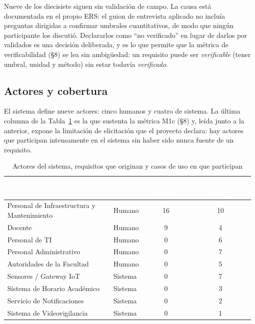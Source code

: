 Nueve de los diecisiete siguen sin validaci\'on de campo. La causa est\'a documentada en el propio ERS: el guion de entrevista aplicado no inclu\'ia preguntas dirigidas a confirmar umbrales cuantitativos, de modo que ning\'un participante los discuti\'o. Declararlos como ``no verificado'' en lugar de darlos por validados es una decisi\'on deliberada, y es lo que permite que la m\'etrica de verificabilidad (\S8) se lea sin ambig\"uedad: un requisito puede ser \emph{verificable} (tener umbral, unidad y m\'etodo) sin estar todav\'ia \emph{verificado}.

\subsection{Actores y cobertura}

El sistema define nueve actores: cinco humanos y cuatro de sistema. La \'ultima columna de la Tabla~\ref{tab:actores} es la que sustenta la m\'etrica M1c (\S8) y, le\'ida junto a la anterior, expone la limitaci\'on de elicitaci\'on que el proyecto declara: hay actores que participan intensamente en el sistema sin haber sido nunca fuente de un requisito.

\begin{table}[H]
\centering
\small
\begin{tabular}{|p{4.6cm}|l|c|c|}
\hline
\cellcolor{sigagreen}\textcolor{white}{\textbf{Actor}} & \cellcolor{sigagreen}\textcolor{white}{\textbf{Tipo}} & \cellcolor{sigagreen}\textcolor{white}{\textbf{RF que origina}} & \cellcolor{sigagreen}\textcolor{white}{\textbf{CU en que participa}} \\ \hline
Personal de Infraestructura y Mantenimiento & Humano & 16 & 10 \\ \hline
Docente & Humano & 9 & 4 \\ \hline
Personal de TI & Humano & 0 & 6 \\ \hline
Personal Administrativo & Humano & 0 & 7 \\ \hline
Autoridades de la Facultad & Humano & 0 & 5 \\ \hline
Sensores / Gateway IoT & Sistema & 0 & 7 \\ \hline
Sistema de Horario Acad\'emico & Sistema & 0 & 3 \\ \hline
Servicio de Notificaciones & Sistema & 0 & 2 \\ \hline
Sistema de Videovigilancia & Sistema & 0 & 1 \\ \hline
\end{tabular}
\caption{Actores del sistema, requisitos que originan y casos de uso en que participan}
\label{tab:actores}
\end{table}

